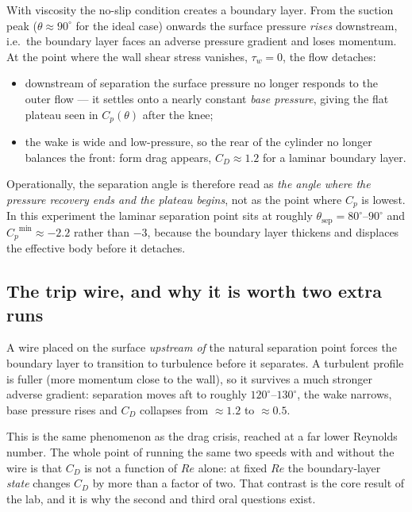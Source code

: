 \documentclass[11pt,a4paper]{article}
\newcommand{\Cp}{\ensuremath{C_p}}
\newcommand{\CD}{\ensuremath{C_D}}
\newcommand{\ReD}{\ensuremath{\mathit{Re}}}
\newcommand{\thsep}{\ensuremath{\theta_{\text{sep}}}}
\begin{document}
With viscosity the no-slip condition creates a boundary layer. From the suction peak
($\theta \approx 90^\circ$ for the ideal case) onwards the surface pressure \emph{rises}
downstream, i.e.\ the boundary layer faces an adverse pressure gradient and loses momentum.
At the point where the wall shear stress vanishes, $\tau_w = 0$, the flow detaches:
\begin{itemize}[leftmargin=1.2em,itemsep=1pt,topsep=2pt]
\item downstream of separation the surface pressure no longer responds to the outer flow ---
it settles onto a nearly constant \emph{base pressure}, giving the flat plateau seen in
$\Cp(\theta)$ after the knee;
\item the wake is wide and low-pressure, so the rear of the cylinder no longer balances the
front: form drag appears, $\CD \approx 1.2$ for a laminar boundary layer.
\end{itemize}
Operationally, the separation angle is therefore read as \emph{the angle where the pressure
recovery ends and the plateau begins}, not as the point where $\Cp$ is lowest. In this
experiment the laminar separation point sits at roughly $\thsep = 80^\circ$--$90^\circ$ and
$\Cp^{\min} \approx -2.2$ rather than $-3$, because the boundary layer thickens and
displaces the effective body before it detaches.

\subsection{The trip wire, and why it is worth two extra runs}

A wire placed on the surface \emph{upstream of} the natural separation point forces the
boundary layer to transition to turbulence before it separates. A turbulent profile is fuller
(more momentum close to the wall), so it survives a much stronger adverse gradient: separation
moves aft to roughly $120^\circ$--$130^\circ$, the wake narrows, base pressure rises and
$\CD$ collapses from $\approx 1.2$ to $\approx 0.5$.

This is the same phenomenon as the drag crisis, reached at a far lower Reynolds number. The
whole point of running the same two speeds with and without the wire is that \CD{} is not a
function of $\ReD$ alone: at fixed $\ReD$ the boundary-layer \emph{state} changes \CD{} by
more than a factor of two. That contrast is the core result of the lab, and it is why the
second and third oral questions exist.

\end{document}
